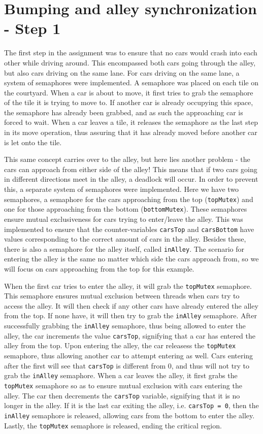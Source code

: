 \section{Bumping and alley synchronization - Step 1}
\label{step1}
The first step in the assignment was to ensure that no cars would crash into each other while driving around. This encompassed both cars going through the alley, but also cars driving on the same lane. For cars driving on the same lane, a system of semaphores were implemented. A semaphore was placed on each tile on the courtyard. When a car is about to move, it first tries to grab the semaphore of the tile it is trying to move to. If another car is already occupying this space, the semaphore has already been grabbed, and as such the approaching car is forced to wait. When a car leaves a tile, it releases the semaphore as the last step in its move operation, thus assuring that it has already moved before another car is let onto the tile.

This same concept carries over to the alley, but here lies another problem - the cars can approach from either side of the alley! This means that if two cars going in different directions meet in the alley, a deadlock will occur. In order to prevent this, a separate system of semaphores were implemented. Here we have two semaphores, a semaphore for the cars approaching from the top (\texttt{topMutex}) and one for those approaching from the bottom (\texttt{bottomMutex}). These semaphores ensure mutual exclusiveness for cars trying to enter/leave the alley. This was implemented to ensure that the counter-variables \texttt{carsTop} and \texttt{carsBottom} have values corresponding to the correct amount of cars in the alley. Besides these, there is also a semaphore for the alley itself, called \texttt{inAlley}. The scenario for entering the alley is the same no matter which side the cars approach from, so we will focus on cars approaching from the top for this example. 

When the first car tries to enter the alley, it will grab the \texttt{topMutex} semaphore. This semaphore ensures mutual exclusion between threads when cars try to access the alley. It will then check if any other cars have already entered the alley from the top. If none have, it will then try to grab the \texttt{inAlley} semaphore. After successfully grabbing the \texttt{inAlley} semaphore, thus being allowed to enter the alley, the car increments the value \texttt{carsTop}, signifying that a car has entered the alley from the top. Upon entering the alley, the car releasess the \texttt{topMutex} semaphore, thus allowing another car to attempt entering as well. Cars entering after the first will see that \texttt{carsTop} is different from 0, and thus will not try to grab the \texttt{inAlley} semaphore. When a car leaves the alley, it first grabs the \texttt{topMutex} semaphore so as to ensure mutual exclusion with cars entering the alley. The car then decrements the \texttt{carsTop} variable, signifying that it is no longer in the alley. If it is the last car exiting the alley, i.e. \texttt{carsTop = 0}, then the \texttt{inAlley} semaphore is released, allowing cars from the bottom to enter the alley. Lastly, the \texttt{topMutex} semaphore is released, ending the critical region.

